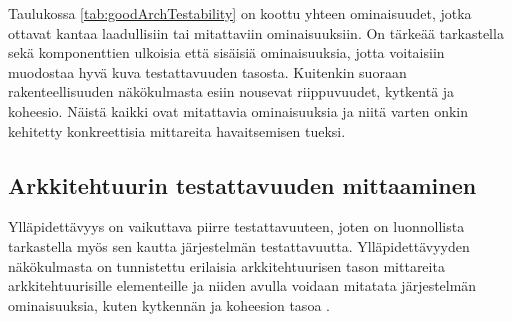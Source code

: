 \documentclass[finnish]{tktltiki2}
\numberwithin{table}{section}
\theoremstyle{definition}
\theoremstyle{remark}
\begin{document}
\begin{table}[H]
	\centering
	\setlength{\extrarowheight}{10pt}%
	\caption{Hyvään testattavuuteen vaikuttavat ominaisuudet jaoteltuna kahteen eri luokaan: laadulliset ja metriset.}
	\label{tab:goodArchTestability}
\end{table}

\noindent
Taulukossa \ref{tab:goodArchTestability} on koottu yhteen ominaisuudet, jotka ottavat kantaa laadullisiin tai mitattaviin ominaisuuksiin. On tärkeää tarkastella sekä komponenttien ulkoisia että sisäisiä ominaisuuksia, jotta voitaisiin muodostaa hyvä kuva testattavuuden tasosta. Kuitenkin suoraan rakenteellisuuden näkökulmasta esiin nousevat riippuvuudet, kytkentä ja koheesio. Näistä kaikki ovat mitattavia ominaisuuksia ja niitä varten onkin kehitetty konkreettisia mittareita havaitsemisen tueksi.  


\subsection{Arkkitehtuurin testattavuuden mittaaminen} \label{arch_testability_measurement}

Ylläpidettävyys on vaikuttava piirre testattavuuteen, joten on luonnollista tarkastella myös sen kautta järjestelmän testattavuutta. Ylläpidettävyyden näkökulmasta on tunnistettu erilaisia arkkitehtuurisen tason mittareita arkkitehtuurisille elementeille ja niiden avulla voidaan mitatata järjestelmän ominaisuuksia, kuten kytkennän ja koheesion tasoa \citep{bengtsson1998towards}.  

\iffalse


\begin{itemize}
	\item metodien määrä elementin rajapinnassa
	\item paikkamerkkien (placeholder) määrä arkkitehtuurisille elementeille, joiden avulla elementti parametrisoidaan
	\item elementistä lähtevien viestien määrä
	\item elementtityyppien määrä, joita tarkasteltava elementti toteuttaa (implement)
	\item elementtien määrä, jotka toteuttavat tarkasteltavan elementin tyypin
	\item saatavilla olevien metodien lukumäärä muista elementeistä, jotka ovat yhteydessä tarkasteltavaan elementtiin
	\item elementin metodien ja parametrien määrä
\end{itemize}
\fi
\end{document}
